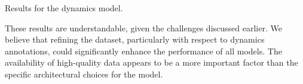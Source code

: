 \begin{table}[ht!]
\centering

\caption[Results for the dynamics model.]{Results for the dynamics model.}
\label{dynamics_results}
\end{table}

These results are understandable, given the challenges discussed earlier. We believe that refining the dataset, particularly with respect to dynamics annotations, could significantly enhance the performance of all models. The availability of high-quality data appears to be a more important factor than the specific architectural choices for the model.